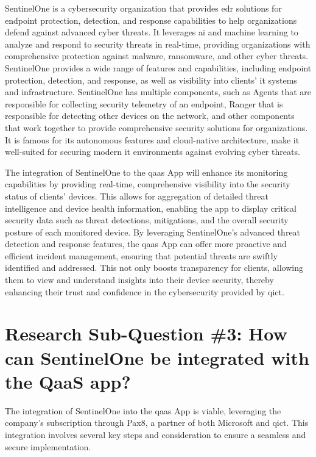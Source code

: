 SentinelOne is a cybersecurity organization that provides \acrshort{edr} solutions for endpoint protection, detection, and response
capabilities to help organizations defend against advanced cyber threats. It leverages \acrshort{ai} and machine learning to
analyze and respond to security threats in real-time, providing organizations with comprehensive protection against
malware, ransomware, and other cyber threats. SentinelOne provides a wide range of features and capabilities, including
endpoint protection, detection, and response, as well as visibility into clients' \acrshort{it} systems and infrastructure.
SentinelOne has multiple components, such as Agents that are responsible for collecting security telemetry of an endpoint,
Ranger that is responsible for detecting other devices on the network, and other components that work together to provide
comprehensive security solutions for organizations. It is famous for its autonomous features and cloud-native architecture,
make it well-suited for securing modern \acrshort{it} environments against evolving cyber threats.

The integration of SentinelOne to the \acrshort{qaas} App will enhance its monitoring capabilities by providing real-time,
comprehensive visibility into the security status of clients' devices. This allows for aggregation of detailed threat
intelligence and device health information, enabling the app to display critical security data such as threat detections,
mitigations, and the overall security posture of each monitored device. By leveraging SentinelOne's advanced threat
detection and response features, the \acrshort{qaas} App can offer more proactive and efficient incident management,
ensuring that potential threats are swiftly identified and addressed. This not only boosts transparency for clients,
allowing them to view and understand insights into their device security, thereby enhancing their trust and confidence
in the cybersecurity provided by \acrshort{qict}.

\section{Research Sub-Question \#3: How can SentinelOne be integrated with the QaaS app?}

The integration of SentinelOne into the \acrshort{qaas} App is viable, leveraging the company's subscription through Pax8,
a partner of both Microsoft and \acrshort{qict}. This integration involves several key steps and consideration to ensure
a seamless and secure implementation.

